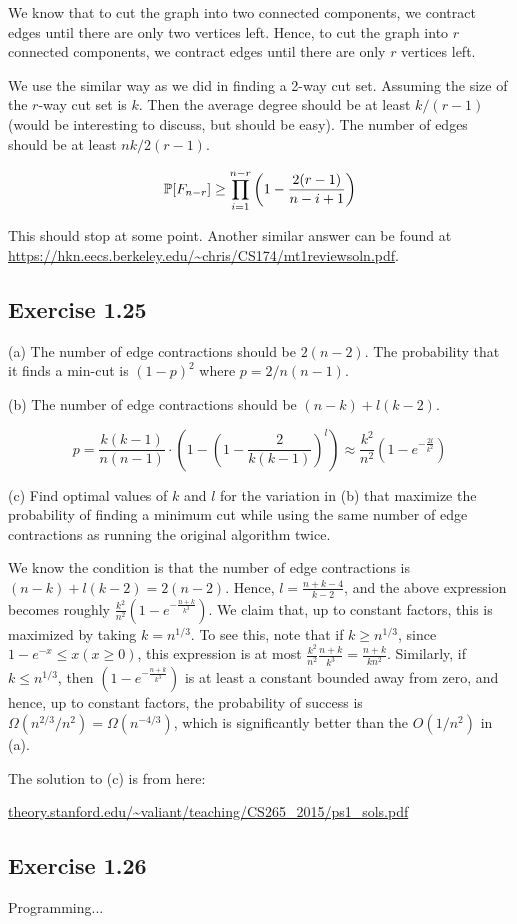 We know that to cut the graph into two connected components, we contract edges until there are only
two vertices left. Hence, to cut the graph into $r$ connected components, we contract edges until there
are only $r$ vertices left. 

We use the similar way as we did in finding a 2-way cut set. Assuming the size of the $r$-way cut set
is $k$. Then the average degree should be at least $k/(r-1)$ (would be interesting to discuss, but should be easy). 
The number of edges should be at least
$nk/2(r-1)$.


\begin{equation*}
\P[F_{n-r}] \geq \prod_{i=1}^{n-r} \left(1- \frac{2(r-1)}{n-i+1}\right)
\end{equation*}

This should stop at some point. Another similar answer can be found at
\url{https://hkn.eecs.berkeley.edu/~chris/CS174/mt1reviewsoln.pdf}.

\subsection*{Exercise 1.25}

\noindent (a) The number of edge contractions should be $2(n-2)$. The probability that it finds a min-cut
is $(1- p)^2$ where $p = 2/n(n-1)$.

\noindent (b) The number of edge contractions should be $(n-k) + l(k-2)$.

\begin{equation*}
p = \frac{k(k-1)}{n(n-1)} \cdot \left(1 - \left(1- \frac{2}{k(k-1)}\right)^l\right) \approx \frac{k^2}{n^2}(1-e^{-\frac{2l}{k^2}})
\end{equation*}

\noindent (c) Find optimal values of $k$ and $l$ for the variation in (b) that maximize the probability
of finding a minimum cut while using the same number of edge contractions as running the original algorithm
twice.

We know the condition is that the number of edge contractions is $(n-k) + l(k-2) = 2(n-2)$. Hence,
$l = \frac{n+k-4}{k-2}$, and the above expression becomes roughly $\frac{k^2}{n^2}(1 - e^{-\frac{n+k}{k^3}})$.
We claim that, up to constant factors, this is maximized by taking $k = n^{1/3}$. To see this, note that
if $k \geq n^{1/3}$, since $1 - e^{-x} \leq x (x\geq 0)$, this expression is at most $\frac{k^2}{n^2}\frac{n+k}{k^3} = \frac{n+k}{kn^2}$.
Similarly, if $k\leq n^{1/3}$,
then $(1 - e^{-\frac{n+k}{k^3}})$ is at least a constant bounded away from zero, and hence, up to constant factors,
the probability of success is $\Omega(n^{2/3}/n^2) = \Omega(n^{-4/3})$, which is significantly better than the
$O(1/n^2)$ in (a).


The solution to (c) is from here:

\url{theory.stanford.edu/~valiant/teaching/CS265_2015/ps1_sols.pdf}

\subsection*{Exercise 1.26}
 
Programming...